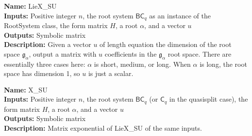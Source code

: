 \documentclass[12pt]{article}
\theoremstyle{definition}
\numberwithin{theorem}{subsection}
\newcommand{\tbf}{\textbf}
\newcommand{\noi}{\noindent}
\newcommand{\incomplete}{\textcolor{red}{INCOMPLETE}}
\newcommand{\ov}{\overline}
\newcommand{\frakg}{\mathfrak{g}}
\DeclareMathOperator{\LieX}{LieX}
\begin{document}
\begin{framed}
\noi \tbf{Name:} LieX\_SU \\
\noi \tbf{Inputs:} Positive integer $n$, the root system $\mathsf{BC}_q$ as an instance of the RootSystem class, the form matrix $H$, a root $\alpha$, and a vector $u$ \\
\noi \tbf{Outputs:} Symbolic matrix \\
\noi \tbf{Description:} Given a vector $u$ of length equation the dimension of the root space $\frakg_\alpha$, output a matrix with $u$ coefficients in the $\frakg_\alpha$ root space. There are essentially three cases here: $\alpha$ is short, medium, or long. When $\alpha$ is long, the root space has dimension 1, so $u$ is just a scalar. 


\end{framed}

\begin{framed}
\noi \tbf{Name:} X\_SU \\
\noi \tbf{Inputs:} Positive integer $n$, the root system $\mathsf{BC}_q$ (or $\mathsf{C}_q$ in the quasisplit case), the form matrix $H$, a root $\alpha$, and a vector $u$ \\
\noi \tbf{Outputs:} Symbolic matrix \\
\noi \tbf{Description:} Matrix exponential of LieX\_SU of the same inputs.
\end{framed}
\end{document}
